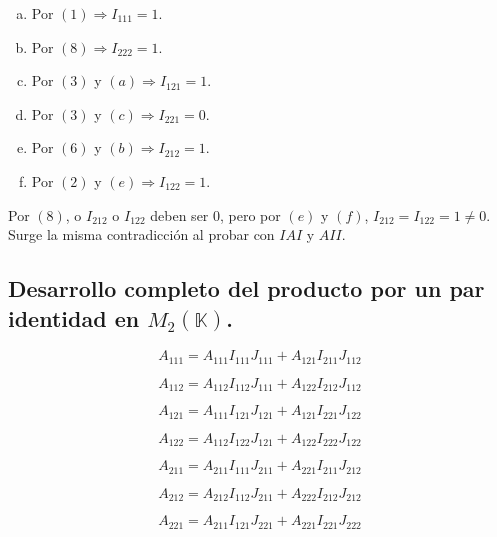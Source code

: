 \begin{enumerate}[(a)]
	\item Por $(1) \Rightarrow I_{111} = 1$.
	\item Por $(8) \Rightarrow I_{222} = 1$.
	\item Por $(3)$ y $(a) \Rightarrow I_{121} = 1$.
	\item Por $(3)$ y $(c) \Rightarrow I_{221} = 0$.
	\item Por $(6)$ y $(b) \Rightarrow I_{212} = 1$.
	\item Por $(2)$ y $(e) \Rightarrow I_{122} = 1$.
\end{enumerate}

Por $(8)$, o $I_{212}$ o $I_{122}$ deben ser $0$, pero por $(e)$ y $(f)$, $I_{212} = I_{122} = 1 \neq 0$. Surge la misma contradicción al probar con $IAI$ y $AII$.

\subsection{Desarrollo completo del producto por un par identidad en $M_2 (\mathbb{K})$.} \label{appendix-2}

\begin{equation}
A_{111} = A_{111} I_{111} J_{111} + A_{121} I_{211} J_{112}
\end{equation}

\begin{equation}
A_{112} = A_{112} I_{112} J_{111} + A_{122} I_{212} J_{112}
\end{equation}

\begin{equation}
A_{121} = A_{111} I_{121} J_{121} + A_{121} I_{221} J_{122}
\end{equation}

\begin{equation}
A_{122} = A_{112} I_{122} J_{121} + A_{122} I_{222} J_{122}
\end{equation}

\begin{equation}
A_{211} = A_{211} I_{111} J_{211} + A_{221} I_{211} J_{212}
\end{equation}

\begin{equation}
A_{212} = A_{212} I_{112} J_{211} + A_{222} I_{212} J_{212}
\end{equation}

\begin{equation}
A_{221} = A_{211} I_{121} J_{221} + A_{221} I_{221} J_{222}
\end{equation}

